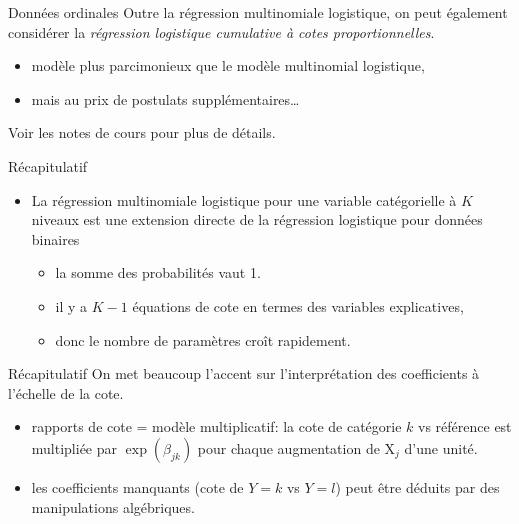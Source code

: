 \documentclass[
  ignorenonframetext,
]{beamer}
\providecommand{\tightlist}{%
  \setlength{\itemsep}{0pt}\setlength{\parskip}{0pt}}\usepackage{longtable,booktabs,array}
\begin{document}
\begin{frame}{Données ordinales}
\label{donnuxe9es-ordinales}
Outre la régression multinomiale logistique, on peut également
considérer la \emph{régression logistique cumulative à cotes
proportionnelles}.

\begin{itemize}
\tightlist
\item
  modèle plus parcimonieux que le modèle multinomial logistique,
\item
  mais au prix de postulats supplémentaires\ldots{}
\end{itemize}

Voir les notes de cours pour plus de détails.
\end{frame}

\begin{frame}{Récapitulatif}
\label{ruxe9capitulatif}
\begin{itemize}
\tightlist
\item
  La régression multinomiale logistique pour une variable catégorielle à
  \(K\) niveaux est une extension directe de la régression logistique
  pour données binaires

  \begin{itemize}
  \tightlist
  \item
    la somme des probabilités vaut 1.
  \item
    il y a \(K-1\) équations de cote en termes des variables
    explicatives,
  \item
    donc le nombre de paramètres croît rapidement.
  \end{itemize}
\end{itemize}
\end{frame}

\begin{frame}{Récapitulatif}
\label{ruxe9capitulatif-1}
On met beaucoup l'accent sur l'interprétation des coefficients à
l'échelle de la cote.

\begin{itemize}
\tightlist
\item
  rapports de cote = modèle multiplicatif: la cote de catégorie \(k\) vs
  référence est multipliée par \(\exp(\beta_{jk})\) pour chaque
  augmentation de \(\mathrm{X}_j\) d'une unité.
\item
  les coefficients manquants (cote de \(Y=k\) vs \(Y=l\)) peut être
  déduits par des manipulations algébriques.
\end{itemize}
\end{frame}
\end{document}
